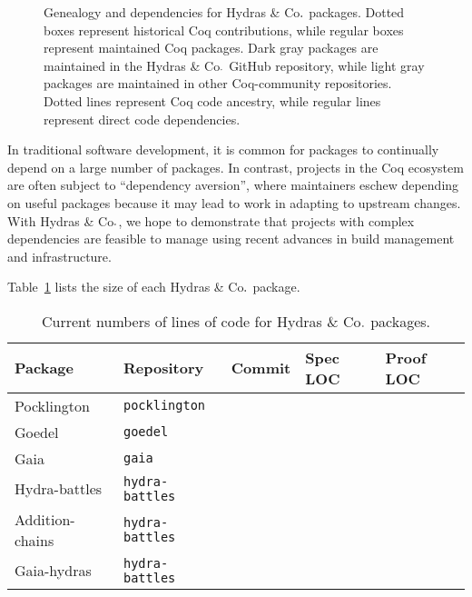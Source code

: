 \documentclass{easychair}
\newcommand{\community}{Coq-community\xspace}
\newcommand{\Hydras}{Hydras \& Co$\text.$\xspace}
\begin{document}
\begin{figure}[h]
{
}
\caption{Genealogy and dependencies for \Hydras packages. Dotted boxes represent historical Coq contributions, while regular boxes represent maintained Coq packages. Dark gray packages are maintained in the \Hydras GitHub repository, while light gray packages are maintained in other \community repositories. Dotted lines represent Coq code ancestry, while regular lines represent direct code dependencies.}
  \label{fig:genealogy}
\end{figure}

In traditional software development, it is common for packages to continually depend on a large number of packages. In contrast, projects in the Coq ecosystem are often subject to ``dependency aversion'', where maintainers eschew depending on useful packages because it may lead to work in adapting to upstream changes. With \Hydras, we hope to demonstrate that projects with complex dependencies are feasible to manage using recent advances in build management and infrastructure.

Table~\ref{tbl:loc} lists the size of each \Hydras package.

\begin{table}
\centering
\footnotesize
\begin{tabular}{|l|l|l|l|l|}
\hline
\textbf{Package} & \textbf{Repository} & \textbf{Commit} & \textbf{Spec LOC} & \textbf{Proof LOC}\\
\hline
Pocklington & \texttt{pocklington} & & & \\
\hline
Goedel & \texttt{goedel} & & & \\
\hline
Gaia & \texttt{gaia} & & & \\
\hline
Hydra-battles & \texttt{hydra-battles} & & & \\
\hline
Addition-chains & \texttt{hydra-battles} & & & \\
\hline
Gaia-hydras & \texttt{hydra-battles} & & & \\
\hline
\end{tabular}
\caption{Current numbers of lines of code for \Hydras packages.}
\label{tbl:loc}
\end{table}
\end{document}
